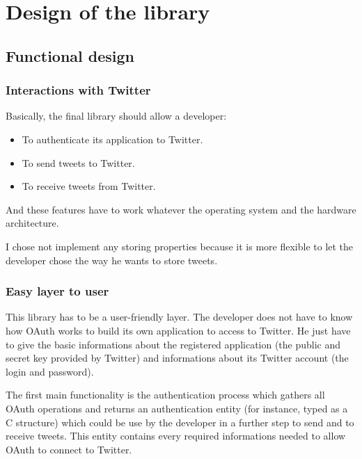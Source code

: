 \chapter{Design of the library}


\section{Functional design}

\subsection{Interactions with Twitter}

\hspace{15mm}Basically, the final library should allow a developer:
\begin{itemize}
\item To authenticate its application to Twitter. 
\item To send tweets to Twitter.
\item To receive tweets from Twitter.
\end{itemize}

And these features have to work whatever the operating system and the hardware architecture.

I chose not implement any storing properties because it is more flexible to let the developer chose the way he wants to store tweets.


\subsection{Easy layer to user}

\hspace{15mm}This library has to be a user-friendly layer. The developer does not have to know how OAuth works to build its own application to access to Twitter. He just have to give the basic informations about the registered application (the public and secret key provided by Twitter) and informations about its Twitter account (the login and password).

The first main functionality is the authentication process which gathers all OAuth operations and returns an authentication entity (for instance, typed as a C structure) which could be use by the developer in a further step to send and to receive tweets. This entity contains every required informations needed to allow OAuth to connect to Twitter. 

